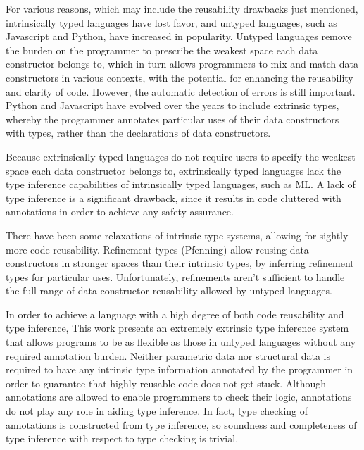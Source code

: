 \documentclass[acmsmall]{acmart}
\theoremstyle{definition}
\begin{document}
For various reasons, which may include the reusability drawbacks just mentioned, 
intrinsically typed languages have lost favor,
and untyped languages, 
such as Javascript and Python, have increased in popularity. 
Untyped languages remove the burden on the programmer to prescribe the weakest space each data constructor belongs to, 
which in turn allows programmers to mix and match data constructors in
various contexts, with the potential for enhancing the reusability and clarity of code.
However, the automatic detection of errors is still important. Python and Javascript have 
evolved over the years to include extrinsic types, whereby the programmer annotates particular uses of
their data constructors with types, rather than the declarations of data constructors.
 
Because extrinsically typed languages do not require users to specify the weakest space each data constructor belongs to,
extrinsically typed languages lack the type inference capabilities of intrinsically typed languages, such as ML. 
A lack of type inference is a significant drawback, since it results in code cluttered with annotations in order
to achieve any safety assurance.

There have been some relaxations of intrinsic type systems, allowing for sightly more code reusability.
Refinement types (Pfenning) \cite{} allow reusing data constructors in stronger spaces than their intrinsic types, by
inferring refinement types for particular uses.
Unfortunately, refinements aren't sufficient to handle the full range of data constructor reusability allowed by untyped languages.

In order to achieve a language with a high degree of both code reusability and type inference, 
This work presents an extremely extrinsic type inference system
that allows programs to be as flexible as those in untyped languages
without any required annotation burden. 
Neither parametric data nor structural data is required to have
any intrinsic type information annotated by the programmer in order
to guarantee that highly reusable code does not get stuck.
Although annotations are allowed to enable programmers to check their logic,
annotations do not play any role in aiding type inference. In fact, 
type checking of annotations is constructed from type inference, 
so soundness and completeness of type inference with respect to type checking is trivial.  


\end{document}
